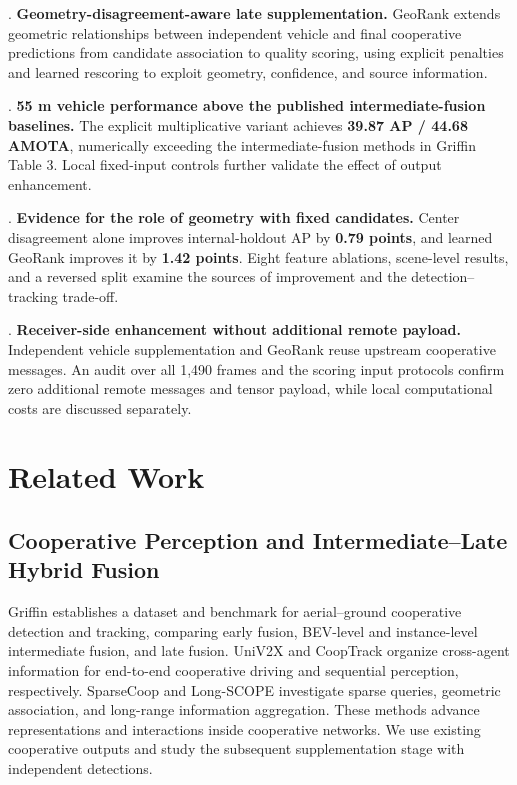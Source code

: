 . \textbf{Geometry-disagreement-aware late supplementation.} GeoRank extends geometric relationships between independent vehicle and final cooperative predictions from candidate association to quality scoring, using explicit penalties and learned rescoring to exploit geometry, confidence, and source information.\par
{}. \textbf{55 m vehicle performance above the published intermediate-fusion baselines.} The explicit multiplicative variant achieves \textbf{39.87 AP / 44.68 AMOTA}, numerically exceeding the intermediate-fusion methods in Griffin Table 3. Local fixed-input controls further validate the effect of output enhancement.\par
{}. \textbf{Evidence for the role of geometry with fixed candidates.} Center disagreement alone improves internal-holdout AP by \textbf{0.79 points}, and learned GeoRank improves it by \textbf{1.42 points}. Eight feature ablations, scene-level results, and a reversed split examine the sources of improvement and the detection--tracking trade-off.\par
{}. \textbf{Receiver-side enhancement without additional remote payload.} Independent vehicle supplementation and GeoRank reuse upstream cooperative messages. An audit over all 1,490 frames and the scoring input protocols confirm zero additional remote messages and tensor payload, while local computational costs are discussed separately.\par

\section{Related Work}

\subsection{Cooperative Perception and Intermediate--Late Hybrid Fusion}

Griffin \cite{ref2} establishes a dataset and benchmark for aerial--ground cooperative detection and tracking, comparing early fusion, BEV-level and instance-level intermediate fusion, and late fusion. UniV2X \cite{ref3} and CoopTrack \cite{ref6} organize cross-agent information for end-to-end cooperative driving and sequential perception, respectively. SparseCoop \cite{ref4} and Long-SCOPE \cite{ref5} investigate sparse queries, geometric association, and long-range information aggregation. These methods advance representations and interactions inside cooperative networks. We use existing cooperative outputs and study the subsequent supplementation stage with independent detections.

